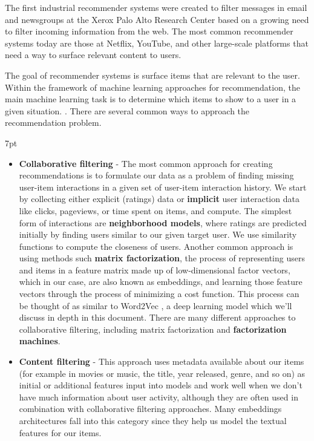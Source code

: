 \documentclass[11pt, table]{diazessay} %
\newenvironment{formal}{%
  \def\FrameCommand{%
	\hspace{1pt}%
	{\color{w_lightblue}\vrule width 2pt}%
	{\color{formalshade}\vrule width 4pt}%
	\colorbox{formalshade}%
  }%
  \MakeFramed{\advance\hsize-\width\FrameRestore}%
  \noindent\hspace{-4.55pt}%
  \begin{adjustwidth}{}{7pt}%
  \vspace{2pt}\vspace{2pt}%
}
{%
  \vspace{2pt}\end{adjustwidth}\endMakeFramed%
}
\begin{document}
\begin{sloppypar}
The first industrial recommender systems were created to filter messages in email and newsgroups \citep{goldberg1992using}  at the Xerox Palo Alto Research Center based on a growing need to filter incoming information from the web.  The most common recommender systems today are those at Netflix, YouTube, and other large-scale platforms that need a way to surface relevant content to users.

The goal of recommender systems is surface items that are relevant to the user. Within the framework of machine learning approaches for recommendation, the main machine learning task is to determine which items to show to a user in a given situation.  \citep{castells2023recommender}. There are several common ways to approach the recommendation problem.

\begin{formal}
\begin{itemize}
  \item \textbf{Collaborative filtering} - The most common approach for creating recommendations is to formulate our data as a problem of finding missing user-item interactions in a given set of user-item interaction history. We start by collecting either explicit (ratings) data or \textbf{implicit} user interaction data like clicks, pageviews, or time spent on items, and compute. The simplest form of interactions are \textbf{neighborhood models}, where ratings are predicted initially by finding users similar to our given target user. We use similarity functions to compute the closeness of users.
  Another common approach is using methods such  \textbf{matrix factorization}, the process of representing users and items in a feature matrix made up of low-dimensional factor vectors, which in our case, are also known as embeddings, and learning those feature vectors through the process of minimizing a cost function. This process can be thought of as similar to Word2Vec \citep{levy2014neural}, a deep learning model which we'll discuss in depth in this document.  There are many different approaches to collaborative filtering, including matrix factorization and  \textbf{factorization machines}.
   \item \textbf{Content filtering} - This approach uses metadata available about our items (for example in movies or music, the title, year released, genre, and so on) as initial or additional features input into models and work well when we don't have much information about user activity, although they are often used in combination with collaborative filtering approaches. Many embeddings architectures fall into this category since they help us model the textual features for our items.  

\end{itemize}
\end{formal}
\end{sloppypar}
\end{document}
